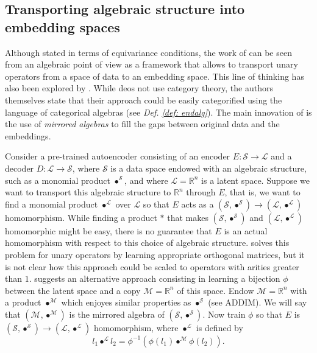 \documentclass[11pt,a4paper,openright,twoside]{report}
\theoremstyle{plain}
\theoremstyle{definition}
\begin{document}
\subsection{Transporting algebraic structure into embedding spaces}

Although stated in terms of equivariance conditions, the work of \cite{chytas2024poolingimagedatasetsmultiple} can be seen from an algebraic point of view as a framework that allows to transport unary operators from a space of data to an embedding space. This line of thinking has also been explored by \cite{pfrommer2024transport}. While \cite{pfrommer2024transport} deos not use category theory, the authors themselves state that their approach could be easily categorified using the language of categorical algebras (see \textit{Def. \ref{def: endalg}}). The main innovation of \cite{pfrommer2024transport} is the use of \textit{mirrored algebras} to fill the gaps between original data and the embeddings.


Consider a pre-trained autoencoder consisting of an encoder $E: \mathcal{S} \to \mathcal{L}$ and a decoder $D: \mathcal{L} \to \mathcal{S}$, where $\mathcal{S}$ is a data space endowed with an algebraic structure, such as a monomial product $\bullet^{\mathcal{S}}$, and where $\mathcal{L}=\mathbb{R}^n$ is a latent space. Suppose we want to transport this algebraic structure to $\mathbb{R}^n$ through $E$, that is, we want to find a monomial product $\bullet^{\mathcal{L}}$ over $\mathcal{L}$ so that $E$ acts as a $(\mathcal{S},\bullet^{\mathcal{S}}) \to (\mathcal{L},\bullet^{\mathcal{L}})$ homomorphism. While finding a product $\ast$ that makes $(\mathcal{S},\bullet^{\mathcal{S}})$ and $(\mathcal{L},\bullet^{\mathcal{L}})$ homomorphic might be easy, there is no guarantee that $E$ is an actual homomorphism with respect to this choice of algebraic structure. \cite{chytas2024poolingimagedatasetsmultiple} solves this problem for unary operators by learning appropriate orthogonal matrices, but it is not clear how this approach could be scaled to operators with arities greater than $1$.  \cite{pfrommer2024transport} suggests an alternative approach consisting in learning a bijection $\phi$ between the latent space and a copy $\mathcal{M} = \mathbb{R}^n$ of this space. Endow $\mathcal{M} = \mathbb{R}^n$ with a product $\bullet^{\mathcal{M}}$ which enjoyes similar properties as $\bullet^{\mathcal{S}}$ (see ADDIM). We will say that $(\mathcal{M},\bullet^{\mathcal{M}})$ is the mirrored algebra of $(\mathcal{S},\bullet^{\mathcal{S}})$. Now train $\phi$ so that $E$ is $(\mathcal{S},\bullet^{\mathcal{S}}) \to (\mathcal{L},\bullet^{\mathcal{L}})$ homomorphism, where $\bullet^{\mathcal{L}}$ is defined by
\[l_1 \bullet^{\mathcal{L}} l_2 = \phi^{-1}(\phi(l_1) \bullet^{\mathcal{M}} \phi(l_2)).\]
\end{document}
